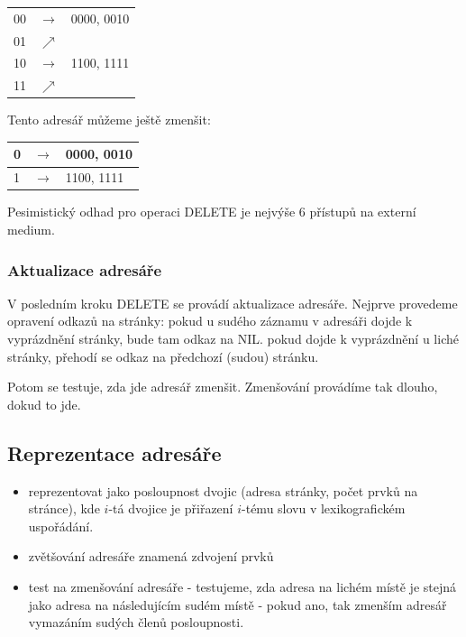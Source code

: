 \begin{priklad}
\begin{tabular}{lll}
00 & $\rightarrow$ & 0000, 0010 \\
01 & $\nearrow$ & \\
\hline
10 & $\rightarrow$ & 1100, 1111	 \\
11 & $\nearrow$	& \\
\end{tabular}

\vspace{5mm}

Tento adresář můžeme ještě zmenšit:

\vspace{5mm}

\begin{tabular}{lll}
0 & $\rightarrow$ & 0000, 0010 \\
\hline
1 & $\rightarrow$ & 1100, 1111 \\
\end{tabular}
\end{priklad}

\begin{pozn}
Pesimistický odhad pro operaci DELETE je nejvýše 6 přístupů na externí 
medium.
\end{pozn}

\subsubsection{Aktualizace adresáře}

V posledním kroku DELETE se provádí aktualizace adresáře. 
Nejprve provedeme opravení odkazů na stránky: pokud u sudého záznamu v
adresáři dojde k vyprázdnění stránky, bude tam odkaz na NIL. pokud dojde k
vyprázdnění u liché stránky, přehodí se odkaz na předchozí (sudou)
stránku.

Potom se testuje, zda jde adresář zmenšit. Zmenšování provádíme tak
dlouho, dokud to jde.

\subsection{Reprezentace adresáře}

\begin{itemize}
\item reprezentovat jako posloupnost dvojic (adresa stránky, počet prvků na
stránce), kde $i$-tá dvojice je přiřazení $i$-tému slovu v lexikografickém
uspořádání.
\item zvětšování adresáře znamená zdvojení prvků
\item test na zmenšování adresáře - testujeme, zda adresa na lichém místě
je stejná jako adresa na následujícím sudém místě - pokud ano, tak zmenším
adresář vymazáním sudých členů posloupnosti.
\end{itemize}

